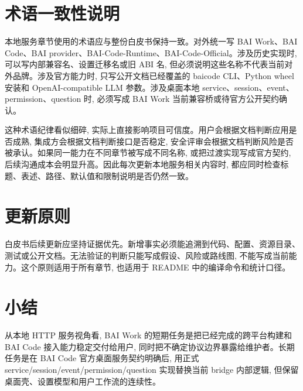 \section{术语一致性说明}
本地服务章节使用的术语应与整份白皮书保持一致。对外统一写 BAI Work、BAI Code、BAI provider、BAI-Code-Runtime、BAI-Code-Official。涉及历史实现时, 可以写内部兼容名、设置迁移名或旧 ABI 名, 但必须说明这些名称不代表当前对外品牌。涉及官方能力时, 只写公开文档已经覆盖的 baicode CLI、Python wheel 安装和 OpenAI-compatible LLM 参数。涉及桌面本地 service、session、event、permission、question 时, 必须写成 BAI Work 当前兼容桥或待官方公开契约确认。

这种术语纪律看似细碎, 实际上直接影响项目可信度。用户会根据文档判断应用是否成熟, 集成方会根据文档判断接口是否稳定, 安全评审会根据文档判断风险是否被承认。如果同一能力在不同章节被写成不同名称, 或把过渡实现写成官方契约, 后续沟通成本会明显升高。因此每次更新本地服务相关内容时, 都应同时检查标题、表述、路径、默认值和限制说明是否仍然一致。

\section{更新原则}
白皮书后续更新应坚持证据优先。新增事实必须能追溯到代码、配置、资源目录、测试或公开文档。无法验证的判断只能写成假设、风险或路线图, 不能写成当前能力。这个原则适用于所有章节, 也适用于 README 中的编译命令和统计口径。

\section{小结}
从本地 HTTP 服务视角看, BAI Work 的短期任务是把已经完成的跨平台构建和 BAI Code 接入能力稳定交付给用户, 同时把不确定协议边界暴露给维护者。长期任务是在 BAI Code 官方桌面服务契约明确后, 用正式 service/session/event/permission/question 实现替换当前 bridge 内部逻辑, 但保留桌面壳、设置模型和用户工作流的连续性。
